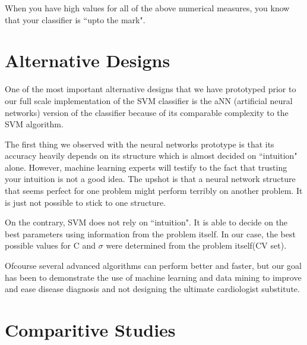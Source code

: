 \documentclass{acm_proc_article-sp}
\begin{document}
When you have high values for all of the above numerical measures, you know that your classifier is ``upto the mark".

\section{Alternative Designs}

One of the most important alternative designs that we have prototyped prior to our full scale implementation of the SVM classifier is the aNN (artificial neural networks) version of the classifier because of its comparable complexity to the
SVM algorithm.

The first thing we observed with the neural networks prototype is that its accuracy heavily depends on its structure which is almost decided on ``intuition" alone. However, machine learning experts will testify to the fact that trusting your intuition is not a good idea. The upshot is that a neural network structure that seems perfect for one problem might perform terribly on another problem. It is just not possible to stick to one structure.

On the contrary, SVM does not rely on ``intuition". It is able to decide on the best parameters using information from the problem itself. In our case, the best possible values for C and $\sigma$ were determined from the problem itself(CV set).

Ofcourse several advanced algorithms can perform better and faster, but our goal has been to demonstrate the use of machine learning and data mining to improve and ease disease diagnosis and not designing the ultimate cardiologist substitute.

\section{Comparitive Studies}
\end{document}
